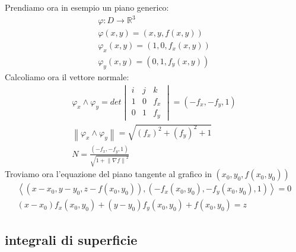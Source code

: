 \documentclass[a4paper, oneside]{article}
\begin{document}
\begin{example}
  Prendiamo ora in esempio un piano generico:
  \begin{gather*}
    \varphi : D \to \mathbb{R}^3\\
    \varphi(x,y) = (x,y, f(x,y))\\
    \varphi_x (x,y) = (1,0,f_x(x,y))\\
    \varphi_y (x,y) = (0,1,f_y(x,y))
  \end{gather*}
  Calcoliamo ora il vettore normale:
  \begin{gather*}
    \varphi_x \land \varphi_y = det \begin{vmatrix}
      i & j & k\\
      1 & 0 & f_x\\
      0 & 1 & f_y
    \end{vmatrix} = (-f_x, -f_y, 1)\\
    \left\lVert \varphi_x \land \varphi_y \right\rVert = \sqrt{(f_x)^2 + (f_y)^2 + 1}\\
    N = \frac{(-f_x, -f_y, 1)}{\sqrt{1 + \left\lVert \nabla f \right\rVert^2 }}
  \end{gather*}
  Troviamo ora l'equazione del piano tangente al grafico in $(x_0,y_0, f(x_0,y_0))$\\
\begin{gather*}
    \left\langle \left( x-x_0, y-y_0, z - f(x_0,y_0) \right), \left( -f_x(x_0,y_0), -f_y(x_0,y_0), 1 \right)  \right\rangle = 0\\
    (x-x_0) f_x(x_0,y_0) + (y-y_0) f_y(x_0,y_0) + f(x_0,y_0) = z
\end{gather*}\end{example}
\subsection{integrali di superficie}
\end{document}
